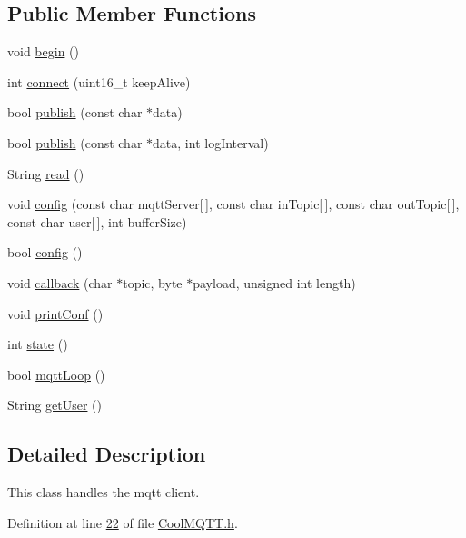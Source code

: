 \subsection*{Public Member Functions}
\begin{DoxyCompactItemize}
\item 
void \hyperlink{class_cool_m_q_t_t_ac9248808641ebf3054ed0620ea9d0100}{begin} ()
\item 
int \hyperlink{class_cool_m_q_t_t_a58b0b1f64b269c2681685208262fba1d}{connect} (uint16\+\_\+t keep\+Alive)
\item 
bool \hyperlink{class_cool_m_q_t_t_ace977b3e90ab14b1199fe5c4fb0a13ec}{publish} (const char $\ast$data)
\item 
bool \hyperlink{class_cool_m_q_t_t_a65a506641740ce797ceadd4fa8a286d3}{publish} (const char $\ast$data, int log\+Interval)
\item 
String \hyperlink{class_cool_m_q_t_t_ae3c18f6ae9723746d32765f1c8f176ca}{read} ()
\item 
void \hyperlink{class_cool_m_q_t_t_a9b703de4f1358f0ee7a5e8c44979c648}{config} (const char mqtt\+Server\mbox{[}$\,$\mbox{]}, const char in\+Topic\mbox{[}$\,$\mbox{]}, const char out\+Topic\mbox{[}$\,$\mbox{]}, const char user\mbox{[}$\,$\mbox{]}, int buffer\+Size)
\item 
bool \hyperlink{class_cool_m_q_t_t_a6571671781a505feca9a8a56e256c6bc}{config} ()
\item 
void \hyperlink{class_cool_m_q_t_t_a30d82ad665bfb603f46ecdbc290775df}{callback} (char $\ast$topic, byte $\ast$payload, unsigned int length)
\item 
void \hyperlink{class_cool_m_q_t_t_a40553a0ad4b5ecf1cb4411ab54ca85fb}{print\+Conf} ()
\item 
int \hyperlink{class_cool_m_q_t_t_a5d003307eff78efbd585e42b43b72b6d}{state} ()
\item 
bool \hyperlink{class_cool_m_q_t_t_aa5eaae967b562b62cbcf2b8d81f6e5d5}{mqtt\+Loop} ()
\item 
String \hyperlink{class_cool_m_q_t_t_a373cc92fca7760d886f02d8a6e5b3f63}{get\+User} ()
\end{DoxyCompactItemize}


\subsection{Detailed Description}
This class handles the mqtt client. 

Definition at line \hyperlink{_cool_m_q_t_t_8h_source_l00022}{22} of file \hyperlink{_cool_m_q_t_t_8h_source}{Cool\+M\+Q\+T\+T.\+h}.



